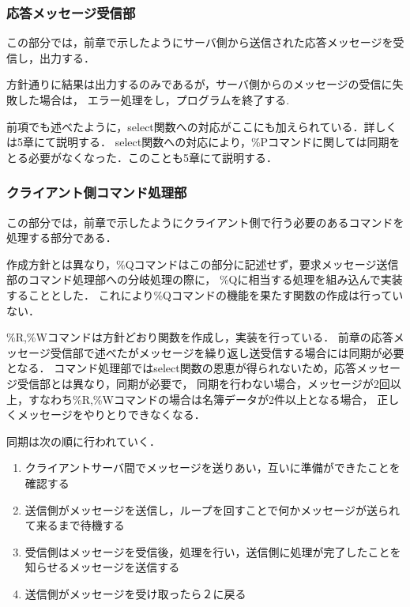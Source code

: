 \documentclass[a4paper,11pt]{jarticle}
\begin{document}
\subsubsection{応答メッセージ受信部} 
この部分では，前章で示したようにサーバ側から送信された応答メッセージを受信し，出力する．

方針通りに結果は出力するのみであるが，サーバ側からのメッセージの受信に失敗した場合は，
エラー処理をし，プログラムを終了する. 

前項でも述べたように，select関数への対応がここにも加えられている．詳しくは5章にて説明する．
select関数への対応により，\%Pコマンドに関しては同期をとる必要がなくなった．このことも5章にて説明する．
\subsubsection{クライアント側コマンド処理部} 
この部分では，前章で示したようにクライアント側で行う必要のあるコマンドを処理する部分である．

作成方針とは異なり，\%Qコマンドはこの部分に記述せず，要求メッセージ送信部のコマンド処理部への分岐処理の際に，
\%Qに相当する処理を組み込んで実装することとした．
これにより\%Qコマンドの機能を果たす関数の作成は行っていない．

\%R,\%Wコマンドは方針どおり関数を作成し，実装を行っている．
前章の応答メッセージ受信部で述べたがメッセージを繰り返し送受信する場合には同期が必要となる．
コマンド処理部ではselect関数の恩恵が得られないため，応答メッセージ受信部とは異なり，同期が必要で，
同期を行わない場合，メッセージが2回以上，すなわち\%R,\%Wコマンドの場合は名簿データが2件以上となる場合，
正しくメッセージをやりとりできなくなる．

同期は次の順に行われていく．
\begin{enumerate}
\setlength{\parskip}{2pt} \setlength{\itemsep}{2pt}
    \item クライアントサーバ間でメッセージを送りあい，互いに準備ができたことを確認する
    \item 送信側がメッセージを送信し，ループを回すことで何かメッセージが送られて来るまで待機する
    \item 受信側はメッセージを受信後，処理を行い，送信側に処理が完了したことを知らせるメッセージを送信する
    \item 送信側がメッセージを受け取ったら２に戻る
\end{enumerate}
\end{document}
